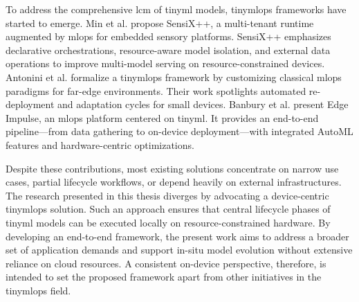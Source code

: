 To address the comprehensive \gls{lcm} of \gls{tinyml} models, \gls{tinymlops} frameworks have started to emerge. Min et al. \cite{minSensiXBringingMLOps2023} propose SensiX++, a multi-tenant runtime augmented by \gls{mlops} for embedded sensory platforms. SensiX++ emphasizes declarative orchestrations, resource-aware model isolation, and external data operations to improve multi-model serving on resource-constrained devices. Antonini et al. \cite{antoniniTinyMLOpsFrameworkOrchestrating2022} formalize a \gls{tinymlops} framework by customizing classical \gls{mlops} paradigms for far-edge environments. Their work spotlights automated re-deployment and adaptation cycles for small devices. Banbury et al. \cite{banburyEdgeImpulseMLOps2023} present Edge Impulse, an \gls{mlops} platform centered on \gls{tinyml}. It provides an end-to-end pipeline—from data gathering to on-device deployment—with integrated AutoML features and hardware-centric optimizations.

Despite these contributions, most existing solutions concentrate on narrow use cases, partial lifecycle workflows, or depend heavily on external infrastructures. The research presented in this thesis diverges by advocating a device-centric \gls{tinymlops} solution. Such an approach ensures that central lifecycle phases of \gls{tinyml} models can be executed locally on resource-constrained hardware. By developing an end-to-end framework, the present work aims to address a broader set of application demands and support in-situ model evolution without extensive reliance on cloud resources. A consistent on-device perspective, therefore, is intended to set the proposed framework apart from other initiatives in the \gls{tinymlops} field.